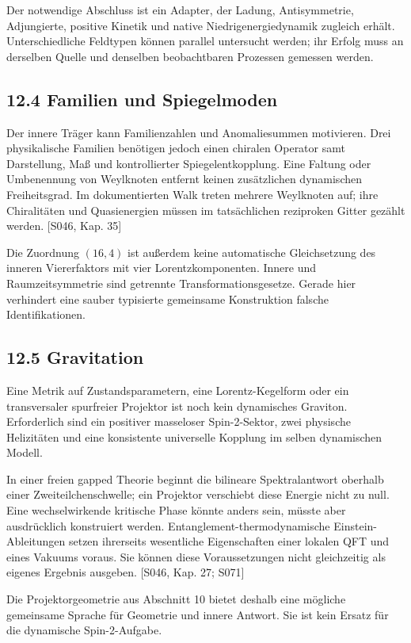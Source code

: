 Der notwendige Abschluss ist ein Adapter, der Ladung, Antisymmetrie,
Adjungierte, positive Kinetik und native Niedrigenergiedynamik zugleich
erhält. Unterschiedliche Feldtypen können parallel untersucht werden;
ihr Erfolg muss an derselben Quelle und denselben beobachtbaren
Prozessen gemessen werden.

\subsection{12.4 Familien und
Spiegelmoden}\label{familien-und-spiegelmoden}

Der innere Träger kann Familienzahlen und Anomaliesummen motivieren.
Drei physikalische Familien benötigen jedoch einen chiralen Operator
samt Darstellung, Maß und kontrollierter Spiegelentkopplung. Eine
Faltung oder Umbenennung von Weylknoten entfernt keinen zusätzlichen
dynamischen Freiheitsgrad. Im dokumentierten Walk treten mehrere
Weylknoten auf; ihre Chiralitäten und Quasienergien müssen im
tatsächlichen reziproken Gitter gezählt werden. {[}S046, Kap. 35{]}

Die Zuordnung \((16,4)\) ist außerdem keine automatische Gleichsetzung
des inneren Viererfaktors mit vier Lorentzkomponenten. Innere und
Raumzeitsymmetrie sind getrennte Transformationsgesetze. Gerade hier
verhindert eine sauber typisierte gemeinsame Konstruktion falsche
Identifikationen.

\subsection{12.5 Gravitation}\label{gravitation}

Eine Metrik auf Zustandsparametern, eine Lorentz-Kegelform oder ein
transversaler spurfreier Projektor ist noch kein dynamisches Graviton.
Erforderlich sind ein positiver masseloser Spin-2-Sektor, zwei physische
Helizitäten und eine konsistente universelle Kopplung im selben
dynamischen Modell.

In einer freien gapped Theorie beginnt die bilineare Spektralantwort
oberhalb einer Zweiteilchenschwelle; ein Projektor verschiebt diese
Energie nicht zu null. Eine wechselwirkende kritische Phase könnte
anders sein, müsste aber ausdrücklich konstruiert werden.
Entanglement-thermodynamische Einstein-Ableitungen setzen ihrerseits
wesentliche Eigenschaften einer lokalen QFT und eines Vakuums voraus.
Sie können diese Voraussetzungen nicht gleichzeitig als eigenes Ergebnis
ausgeben. {[}S046, Kap. 27; S071{]}

Die Projektorgeometrie aus Abschnitt 10 bietet deshalb eine mögliche
gemeinsame Sprache für Geometrie und innere Antwort. Sie ist kein Ersatz
für die dynamische Spin-2-Aufgabe.

